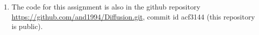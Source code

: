 \documentclass[12pt]{article}
\begin{document}
\begin{enumerate}
\item The code for this assignment is also in the github repository\\
\url{https://github.com/and1994/Diffusion.git}, commit id acf3144 (this repository is public).


\end{enumerate}
\end{document}
